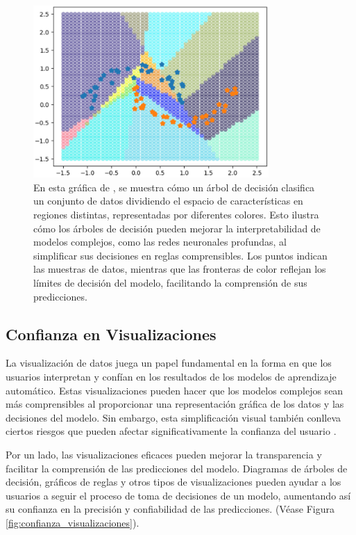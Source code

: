 \begin{figure}[H]
    \centering
    \includegraphics[width=0.8\textwidth]{include/blackbox_vs_whitebox.PNG}
    \caption{En esta gráfica de \cite{aytekin2022neural}, se muestra cómo un árbol de decisión clasifica un conjunto de datos dividiendo el espacio de características en regiones distintas, representadas por diferentes colores. Esto ilustra cómo los árboles de decisión pueden mejorar la interpretabilidad de modelos complejos, como las redes neuronales profundas, al simplificar sus decisiones en reglas comprensibles. Los puntos indican las muestras de datos, mientras que las fronteras de color reflejan los límites de decisión del modelo, facilitando la comprensión de sus predicciones.}
\end{figure}

\subsection{Confianza en Visualizaciones}

La visualización de datos juega un papel fundamental en la forma en que los usuarios interpretan y confían en los resultados de los modelos de aprendizaje automático. Estas visualizaciones pueden hacer que los modelos complejos sean más comprensibles al proporcionar una representación gráfica de los datos y las decisiones del modelo. Sin embargo, esta simplificación visual también conlleva ciertos riesgos que pueden afectar significativamente la confianza del usuario \cite{Poursabzi-2021, Kaur-2020}. 

Por un lado, las visualizaciones eficaces pueden mejorar la transparencia y facilitar la comprensión de las predicciones del modelo. Diagramas de árboles de decisión, gráficos de reglas y otros tipos de visualizaciones pueden ayudar a los usuarios a seguir el proceso de toma de decisiones de un modelo, aumentando así su confianza en la precisión y confiabilidad de las predicciones. (Véase Figura \ref{fig:confianza_visualizaciones}).

